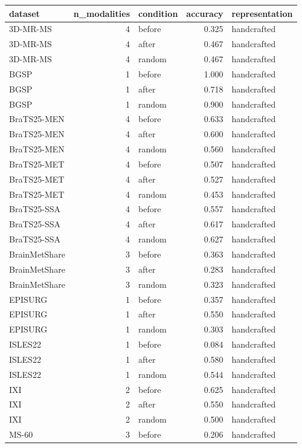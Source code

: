 \begin{tabular}{lrlrl}
\toprule
dataset & n\_modalities & condition & accuracy & representation \\
\midrule
3D-MR-MS & 4 & before & 0.325 & handcrafted \\
3D-MR-MS & 4 & after & 0.467 & handcrafted \\
3D-MR-MS & 4 & random & 0.467 & handcrafted \\
BGSP & 1 & before & 1.000 & handcrafted \\
BGSP & 1 & after & 0.718 & handcrafted \\
BGSP & 1 & random & 0.900 & handcrafted \\
BraTS25-MEN & 4 & before & 0.633 & handcrafted \\
BraTS25-MEN & 4 & after & 0.600 & handcrafted \\
BraTS25-MEN & 4 & random & 0.560 & handcrafted \\
BraTS25-MET & 4 & before & 0.507 & handcrafted \\
BraTS25-MET & 4 & after & 0.527 & handcrafted \\
BraTS25-MET & 4 & random & 0.453 & handcrafted \\
BraTS25-SSA & 4 & before & 0.557 & handcrafted \\
BraTS25-SSA & 4 & after & 0.617 & handcrafted \\
BraTS25-SSA & 4 & random & 0.627 & handcrafted \\
BrainMetShare & 3 & before & 0.363 & handcrafted \\
BrainMetShare & 3 & after & 0.283 & handcrafted \\
BrainMetShare & 3 & random & 0.323 & handcrafted \\
EPISURG & 1 & before & 0.357 & handcrafted \\
EPISURG & 1 & after & 0.550 & handcrafted \\
EPISURG & 1 & random & 0.303 & handcrafted \\
ISLES22 & 1 & before & 0.084 & handcrafted \\
ISLES22 & 1 & after & 0.580 & handcrafted \\
ISLES22 & 1 & random & 0.544 & handcrafted \\
IXI & 2 & before & 0.625 & handcrafted \\
IXI & 2 & after & 0.550 & handcrafted \\
IXI & 2 & random & 0.500 & handcrafted \\
MS-60 & 3 & before & 0.206 & handcrafted \\

\end{tabular}
